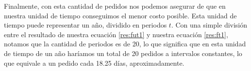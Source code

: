 Finalmente, con esta cantidad de pedidos nos podemos asegurar de que en nuestra unidad de tiempo conseguimos el menor costo posible. Esta unidad de tiempo puede representar un año, dividido en periodos $t$. Con una simple división entre el resultado de nuestra ecuación \ref{res:fut1} y nuestra ecuación \ref{res:ft1}, notamos que la cantidad de periodos es de 20, lo que significa que en esta unidad de tiempo de un año haríamos un total de 20 pedidos a intervalos constantes, lo que equivale a un pedido cada 18.25 días, aproximadamente.

\clearpage

